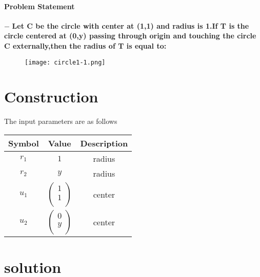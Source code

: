 \documentclass[10pt, a4paper]{article}
\title{\mytitle}
\author{\myauthor\hspace{1em}\\\contact\\FWC22094\hspace{6.5em}IITH\hspace{0.5em}\mymodule\hspace{6em}MATRICES}
\date{}
\begin{document}
 \maketitle
 \paragraph*{\large Problem Statement}
$-$ \textbf{ Let C be the circle with center at (1,1) and radius is 1.If T is the circle centered at (0,y) passing through origin and touching the circle C externally,then the radius of T is equal to:}
 
\begin{figure}[h]
\centering
\texttt{[image: circle1-1.png]}
\end{figure}
 \section*{Construction}
\vspace{2mm}
 The input parameters are as follows
{
\setlength\extrarowheight{4pt}
\begin{center}
 \begin{tabular}{|c|c|c|}
 \hline
 \textbf{Symbol}&\textbf{Value}&\textbf{Description}\\
 \hline
 $r_1$&$
 1$
 &radius  \\
 \hline
 $r_2$&$
 y$
 &radius\\
 \hline
 
 $u_1$&$
 \begin{pmatrix}
  1\\
  1\\
 \end{pmatrix}$
 &center\\
 \hline
 $u_2$&$
 \begin{pmatrix}
  0\\
  y\\
 \end{pmatrix}$
 &center\\
 \hline
 
 \end{tabular}
 \end{center}
}
\section*{\large solution}
\end{document}
